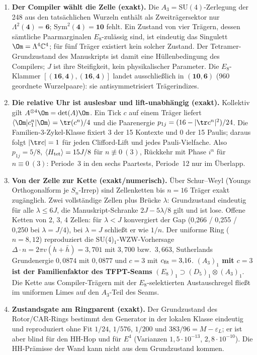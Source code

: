 \begin{enumerate}[leftmargin=*]
\item \textbf{Der Compiler wählt die Zelle (exakt).} Die $A_3=\mathrm{SU}(4)$-Zerlegung der 248 aus den tatsächlichen Wurzeln enthält als Zweiträgersektor nur $\Lambda^2(\mathbf 4)=\mathbf 6$; $\mathrm{Sym}^2(\mathbf 4)=\mathbf{10}$ fehlt. Ein Zustand von vier Trägern, dessen sämtliche Paarmarginalen $E_8$-zulässig sind, ist eindeutig das Singulett $\Om=\Lambda^4\mathbb C^4$; für fünf Träger existiert kein solcher Zustand. Der Tetramer-Grundzustand des Manuskripts ist damit eine Hüllenbedingung des Compilers; $J$ ist ihre Steifigkeit, kein physikalischer Parameter. Die $E_8$-Klammer $[(\mathbf{16},\mathbf 4),(\mathbf{16},\mathbf 4)]$ landet ausschließlich in $(\mathbf{10},\mathbf 6)$ (960 geordnete Wurzelpaare): sie antisymmetrisiert Trägerindizes.
\item \textbf{Die relative Uhr ist auslesbar und lift-unabhängig (exakt).} Kollektiv gilt $A^{\otimes4}\Om=\det(A)\Om$. Ein Tick $c$ auf einem Träger liefert $\langle\Om|c_1^n|\Om\rangle=\tr(c^n)/4$ und die Paarenergie $p_{1j}=(16-|\tr c^n|^2)/24$. Die Familien-3-Zykel-Klasse fixiert 3 der 15 Kontexte und 0 der 15 Paulis; daraus folgt $|\tr c|=1$ für jeden Clifford-Lift und jedes Pauli-Vielfache. Also $p_{1j}=5/8$, $\langle H_{\rm tet}\rangle=15J/8$ für $n\not\equiv0\ (3)$, Rückkehr mit Phase $i^n$ für $n\equiv0\ (3)$: Periode~3 in den sechs Paartests, Periode~12 nur im Überlapp.
\item \textbf{Von der Zelle zur Kette (exakt/numerisch).} Über Schur--Weyl (Youngs Orthogonalform je $S_n$-Irrep) sind Zellenketten bis $n=16$ Träger exakt zugänglich. Zwei vollständige Zellen plus Brücke $\lambda$: Grundzustand eindeutig für alle $\lambda\le6J$, die Manuskript-Schranke $2J-5\lambda/8$ gilt und ist lose. Offene Ketten von 2, 3, 4 Zellen: für $\lambda<J$ konvergiert der Gap (0{,}266 / 0{,}255 / 0{,}250 bei $\lambda=J/4$), bei $\lambda=J$ schließt er wie $1/n$. Der uniforme Ring ($n=8,12$) reproduziert die SU(4)$_1$-WZW-Vorhersage $\Delta\cdot n=2\pi v(h+\bar h)=3{,}701$ mit $3{,}700$ bzw.\ $3{,}663$, Sutherlands Grundenergie $0{,}0874$ mit $0{,}0877$ und $c=3$ mit $c_{\rm fit}=3{,}16$. \textbf{$(A_3)_1$ mit $c=3$ ist der Familienfaktor des TFPT-Seams} $(E_8)_1\supset(D_5)_1\otimes(A_3)_1$. Die Kette aus Compiler-Trägern mit der $E_8$-selektierten Austauschregel fließt im uniformen Limes auf den $A_3$-Teil des Seams.
\item \textbf{Zustandsgate am Ringparent (exakt).} Der Grundzustand des Rotor/CAR-Rings bestimmt den Generator in der lokalen Klasse eindeutig und reproduziert ohne Fit $1/24$, $1/576$, $1/200$ und $383/96=M-\varepsilon_L$; er ist aber blind für den HH-Hop und für $E^4$ (Varianzen $1{,}5\cdot10^{-13}$, $2{,}8\cdot10^{-10}$). Die HH-Prämisse der Wand kann nicht aus dem Grundzustand kommen.

\end{enumerate}
